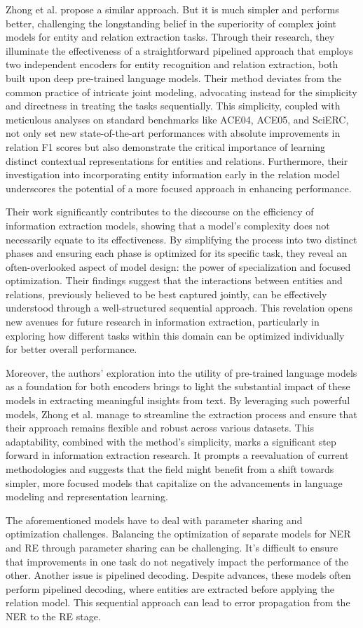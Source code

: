 Zhong et al. \cite{Zhong2020AFE} propose a similar approach. But it is much simpler and performs better, challenging the longstanding belief in the superiority of complex joint models for entity and relation extraction tasks. Through their research, they illuminate the effectiveness of a straightforward pipelined approach that employs two independent encoders for entity recognition and relation extraction, both built upon deep pre-trained language models. Their method deviates from the common practice of intricate joint modeling, advocating instead for the simplicity and directness in treating the tasks sequentially. This simplicity, coupled with meticulous analyses on standard benchmarks like ACE04, ACE05, and SciERC, not only set new state-of-the-art performances with absolute improvements in relation F1 scores but also demonstrate the critical importance of learning distinct contextual representations for entities and relations. Furthermore, their investigation into incorporating entity information early in the relation model underscores the potential of a more focused approach in enhancing performance.

Their work significantly contributes to the discourse on the efficiency of information extraction models, showing that a model's complexity does not necessarily equate to its effectiveness. By simplifying the process into two distinct phases and ensuring each phase is optimized for its specific task, they reveal an often-overlooked aspect of model design: the power of specialization and focused optimization. Their findings suggest that the interactions between entities and relations, previously believed to be best captured jointly, can be effectively understood through a well-structured sequential approach. This revelation opens new avenues for future research in information extraction, particularly in exploring how different tasks within this domain can be optimized individually for better overall performance.

Moreover, the authors' exploration into the utility of pre-trained language models as a foundation for both encoders brings to light the substantial impact of these models in extracting meaningful insights from text. By leveraging such powerful models, Zhong et al. manage to streamline the extraction process and ensure that their approach remains flexible and robust across various datasets. This adaptability, combined with the method's simplicity, marks a significant step forward in information extraction research. It prompts a reevaluation of current methodologies and suggests that the field might benefit from a shift towards simpler, more focused models that capitalize on the advancements in language modeling and representation learning.

The aforementioned models have to deal with parameter sharing and optimization challenges. Balancing the optimization of separate models for NER and RE through parameter sharing can be challenging. It's difficult to ensure that improvements in one task do not negatively impact the performance of the other. Another issue is pipelined decoding. Despite advances, these models often perform pipelined decoding, where entities are extracted before applying the relation model. This sequential approach can lead to error propagation from the NER to the RE stage.
